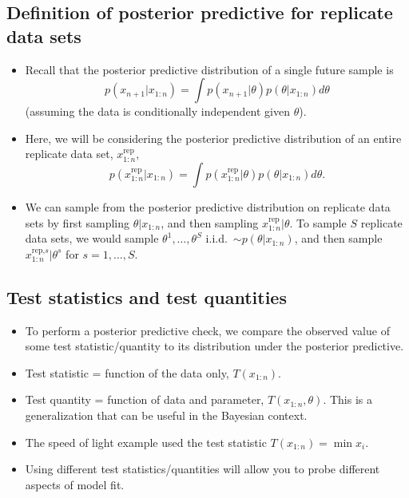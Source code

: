 \documentclass[12pt]{article}
\begin{document}
\subsection*{Definition of posterior predictive for replicate data sets}
\begin{itemize}
\item Recall that the posterior predictive distribution of a single future sample is 
$$p(x_{n +1}| x_{1:n}) = \int p(x_{n +1} | \theta)p(\theta | x_{1:n}) d \theta $$
(assuming the data is conditionally independent given $\theta$).
\item Here, we will be considering the posterior predictive distribution of an entire replicate data set, $x_{1:n}^\text{rep}$,
$$ p(x_{1:n}^\text{rep} | x_{1:n}) = \int p(x_{1:n}^\text{rep} | \theta)p(\theta | x_{1:n}) d \theta. $$
\item We can sample from the posterior predictive distribution on replicate data sets by first sampling $\theta | x_{1:n}$, and then sampling $x_{1:n}^\text{rep}| \theta$.  To sample $S$ replicate data sets, we would sample $\theta^1,\ldots,\theta^S$ i.i.d.\ $\sim p(\theta | x_{1:n})$, and then sample $x_{1:n}^{\text{rep,}s} | \theta^{s}$ for $s = 1,\ldots,S$.
\end{itemize}


\subsection*{Test statistics and test quantities}
\begin{itemize}
\item To perform a posterior predictive check, we compare the observed value of some test statistic/quantity to its distribution under the posterior predictive.
\item Test statistic = function of the data only, $T(x_{1:n})$.
\item Test quantity = function of data and parameter, $T(x_{1:n},\theta)$. This is a generalization that can be useful in the Bayesian context.
\item The speed of light example used the test statistic $T(x_{1:n}) = \min x_i$. 
\item Using different test statistics/quantities will allow you to probe different aspects of model fit.
\end{itemize}
\end{document}
